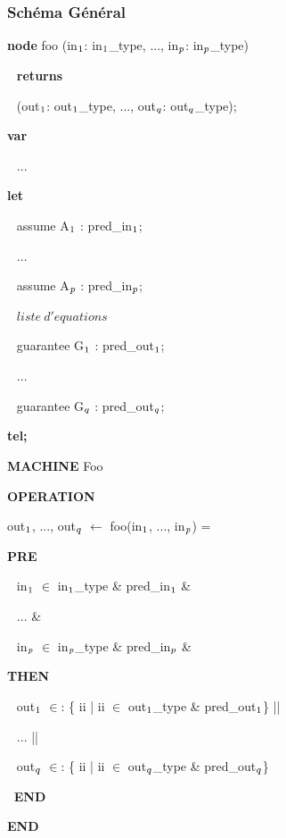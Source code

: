 \documentclass[10pt]{beamer}
\begin{document}
\begin{frame}
  \frametitle{Schéma Général}
\begin{scriptsize}
\setlength{\columnseprule}{0.05cm}
\begin{multicols}{2}
\begin{semiverbatim}
\textbf{node} foo (in$\sb{1}$: in$\sb{1}$\_type, ..., in$\sb{p}$: in$\sb{p}$\_type) 

$~~$  \textbf{returns}

$~~$  (out$\sb{1}$: out$\sb{1}$\_type, ..., out$\sb{q}$: out$\sb{q}$\_type);

\textbf{var}

$~~$  ...

\textbf{let}

$~~$  assume A$\sb{1}$ : pred\_in$\sb{1}$;

$~~$  ...

$~~$  assume A$\sb{p}$ : pred\_in$\sb{p}$;


$~~$  $ liste ~d'equations $


$~~$  guarantee G$\sb{1}$ : pred\_out$\sb{1}$;

$~~$  ...

$~~$  guarantee G$\sb{q}$ : pred\_out$\sb{q}$;

\textbf{tel;}
\end{semiverbatim}
\columnbreak

\begin{semiverbatim}
\textbf{MACHINE} Foo


\textbf{OPERATION}

out$\sb{1}$, ..., out$\sb{q}$ $\leftarrow$ foo(in$\sb{1}$, ..., in$\sb{p}$) =

  \textbf{PRE}

$~~$    in$\sb{1}$ $\in$ in$\sb{1}$\_type \& pred\_in$\sb{1}$ \&

$~~$    ... \&

$~~$    in$\sb{p}$ $\in$ in$\sb{p}$\_type \& pred\_in$\sb{p}$ \&

  \textbf{THEN}

$~~$    out$\sb{1}$ $\in$: \{ ii | ii $\in$ out$\sb{1}$\_type \&
  pred\_out$\sb{1}$\} ||

$~~$    ... ||

$~~$    out$\sb{q}$ $\in$: \{ ii | ii $\in$ out$\sb{q}$\_type \& pred\_out$\sb{q}$\}

$~$  \textbf{END}

\textbf{END}
\end{semiverbatim}
\end{multicols}
\end{scriptsize}
\end{frame}
\end{document}
